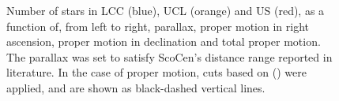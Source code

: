 \begin{figure}[!ht]%
    \centering
    \qquad
    \qquad
    \caption{\scriptsize{Number of stars in LCC (blue), UCL (orange) and US (red), as a function of, from left to right, parallax, proper motion in right ascension, proper motion in declination and total proper motion. The parallax was set to satisfy ScoCen's distance range reported in literature. In the case of proper motion, cuts based on  (\citeyear{2018MNRAS.tmp..210W}) were applied, and are shown as black-dashed vertical lines.}}%
    \label{fig:Hist_ScoCen_Mamajek}%
\end{figure}  

